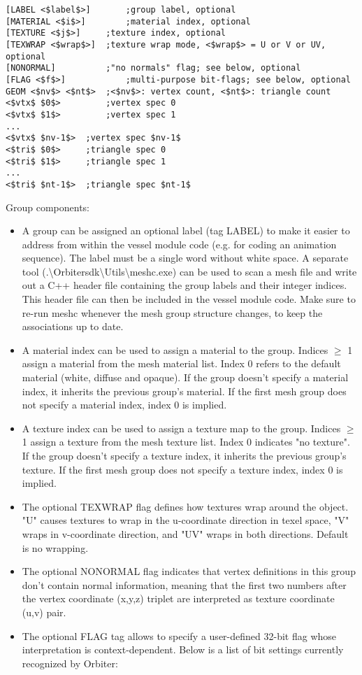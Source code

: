 \documentclass[Orbiter Developer Manual.tex]{subfiles}
\begin{document}
\begin{lstlisting}[language=OSFS,mathescape=true]
[LABEL <$label$>]		;group label, optional
[MATERIAL <$i$>]		;material index, optional
[TEXTURE <$j$>]		;texture index, optional
[TEXWRAP <$wrap$>]	;texture wrap mode, <$wrap$> = U or V or UV, optional
[NONORMAL]			;"no normals" flag; see below, optional
[FLAG <$f$>]			;multi-purpose bit-flags; see below, optional
GEOM <$nv$> <$nt$>	;<$nv$>: vertex count, <$nt$>: triangle count
<$vtx$ $0$>			;vertex spec 0
<$vtx$ $1$>			;vertex spec 1
...
<$vtx$ $nv-1$>	;vertex spec $nv-1$
<$tri$ $0$>		;triangle spec 0
<$tri$ $1$>		;triangle spec 1
...
<$tri$ $nt-1$>	;triangle spec $nt-1$
\end{lstlisting}

\noindent
Group components:

\begin{itemize}
\item A group can be assigned an optional label (tag LABEL) to make it easier to address from within the vessel module code (e.g. for coding an animation sequence). The label must be a single word without white space. A separate tool (.\textbackslash Orbitersdk\textbackslash Utils\textbackslash meshc.exe) can be used to scan a mesh file and write out a C++ header file containing the group labels and their integer indices. This header file can then be included in the vessel module code. Make sure to re-run meshc whenever the mesh group structure changes, to keep the associations up to date.
\item A material index can be used to assign a material to the group. Indices $\geq$ 1 assign a material from the mesh material list. Index 0 refers to the default material (white, diffuse and opaque). If the group doesn't specify a material index, it inherits the previous group's material. If the first mesh group does not specify a material index, index 0 is implied.
\item A texture index can be used to assign a texture map to the group. Indices $\geq$ 1 assign a texture from the mesh texture list. Index 0 indicates "no texture". If the group doesn't specify a texture index, it inherits the previous group's texture. If the first mesh group does not specify a texture index, index 0 is implied.
\item The optional TEXWRAP flag defines how textures wrap around the object. "U" causes textures to wrap in the u-coordinate direction in texel space, "V" wraps in v-coordinate direction, and "UV" wraps in both directions. Default is no wrapping.
\item The optional NONORMAL flag indicates that vertex definitions in this group don't contain normal information, meaning that the first two numbers after the vertex coordinate (x,y,z) triplet are interpreted as texture coordinate (u,v) pair.
\item The optional FLAG tag allows to specify a user-defined 32-bit flag whose interpretation is context-dependent. Below is a list of bit settings currently recognized by Orbiter:


\end{itemize}
\end{document}
